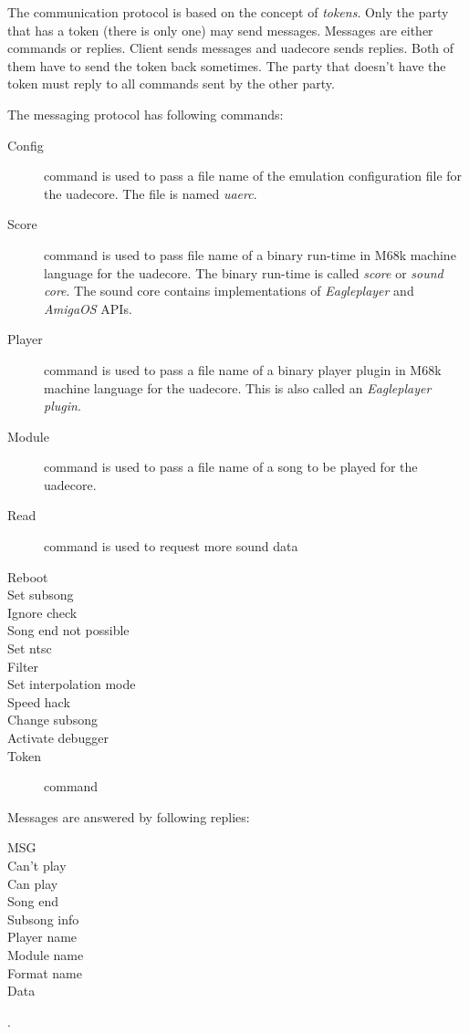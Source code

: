 \documentclass{article}
\begin{document}
The communication protocol is based on the concept of
\emph{tokens}. Only the party that has a token (there is only one) may
send messages. Messages are either commands or replies. Client sends
messages and uadecore sends replies. Both of them have to send the token back
sometimes. The party that doesn't have the token must reply to all commands
sent by the other party.

The messaging protocol has following commands:

\begin{description}
\item [Config] command is used to pass a file name of the emulation
configuration file for the uadecore. The file is named \emph{uaerc}.

\item [Score] command is used to pass file name of a binary run-time in M68k
machine language for the uadecore. The binary run-time is called
\emph{score} or \emph{sound core}. The sound core contains implementations of
\emph{Eagleplayer} and \emph{AmigaOS} APIs.

\item [Player] command is used to pass a file name of a binary player plugin
in M68k machine language for the uadecore. This is also called an
\emph{Eagleplayer plugin}.

\item [Module] command is used to pass a file name of a song to be played
for the uadecore.

\item [Read] command is used to request more sound data

\item [Reboot]
\item [Set subsong]
\item [Ignore check]
\item [Song end not possible]
\item [Set ntsc]
\item [Filter]
\item [Set interpolation mode]
\item [Speed hack]
\item [Change subsong]
\item [Activate debugger]
\item [Token] command
\end{description}
Messages are answered by following replies:
\begin{description}
\item [MSG]
\item [Can't play]
\item [Can play]
\item [Song end]
\item [Subsong info]
\item [Player name]
\item [Module name]
\item [Format name]
\item [Data]
\end{description}.
\end{document}
